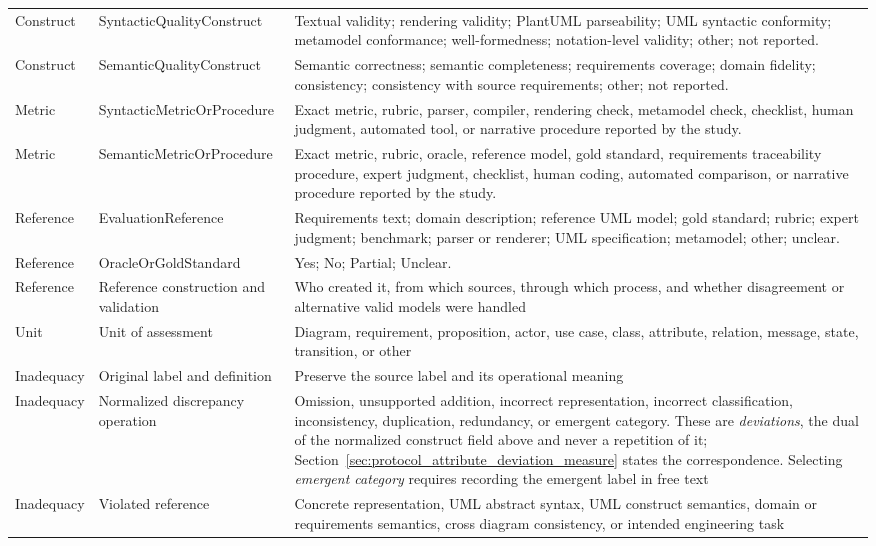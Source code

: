 \begin{longtable}{p{} p{} p{}}
Construct & SyntacticQualityConstruct & Textual validity; rendering validity; PlantUML parseability; UML syntactic conformity; metamodel conformance; well-formedness; notation-level validity; other; not reported. \\
Construct & SemanticQualityConstruct & Semantic correctness; semantic completeness; requirements coverage; domain fidelity; consistency; consistency with source requirements; other; not reported. \\
Metric & SyntacticMetricOrProcedure & Exact metric, rubric, parser, compiler, rendering check, metamodel check, checklist, human judgment, automated tool, or narrative procedure reported by the study. \\
Metric & SemanticMetricOrProcedure & Exact metric, rubric, oracle, reference model, gold standard, requirements traceability procedure, expert judgment, checklist, human coding, automated comparison, or narrative procedure reported by the study. \\
Reference & EvaluationReference & Requirements text; domain description; reference UML model; gold standard; rubric; expert judgment; benchmark; parser or renderer; UML specification; metamodel; other; unclear. \\
Reference & OracleOrGoldStandard & Yes; No; Partial; Unclear. \\
Reference & Reference construction and validation & Who created it, from which sources, through which process, and whether disagreement or alternative valid models were handled \\
Unit & Unit of assessment & Diagram, requirement, proposition, actor, use case, class, attribute, relation, message, state, transition, or other \\
Inadequacy & Original label and definition & Preserve the source label and its operational meaning \\
Inadequacy & Normalized discrepancy operation & Omission, unsupported addition, incorrect representation, incorrect classification, inconsistency, duplication, redundancy, or emergent category. These are \textit{deviations}, the dual of the normalized construct field above and never a repetition of it; Section~\ref{sec:protocol_attribute_deviation_measure} states the correspondence. Selecting \textit{emergent category} requires recording the emergent label in free text \\
Inadequacy & Violated reference & Concrete representation, UML abstract syntax, UML construct semantics, domain or requirements semantics, cross diagram consistency, or intended engineering task \\

\end{longtable}
